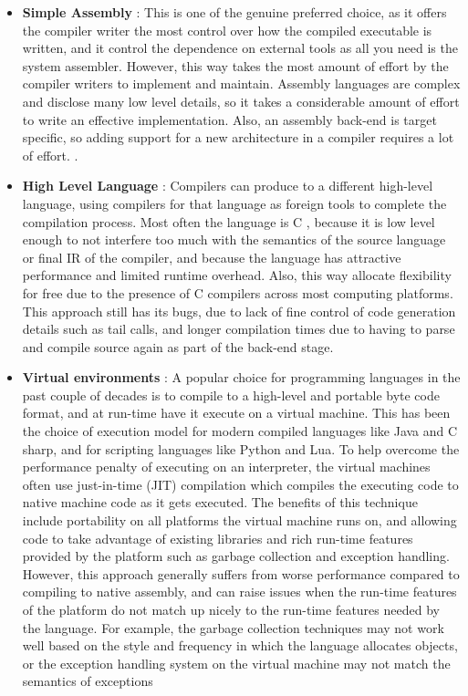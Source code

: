 \documentclass{book}
\begin{document}
	\begin{itemize}
		\item \textbf{Simple Assembly} :  This is one of the genuine preferred choice, as it offers the compiler
		writer the most control over how the compiled executable is written, and it control
		the dependence on external tools as all you need is the system assembler. However, this
		way takes the most amount of effort by the compiler writers to implement and
		maintain.  Assembly languages are complex and disclose many low level details, so
		it takes a considerable amount of effort to write an effective implementation.  Also,
		an assembly back-end is target specific, so adding support for a new architecture in a
		compiler requires a lot of effort.
		.
		\item \textbf{High Level Language} : Compilers can produce to a different high-level language, using
		compilers for that language as foreign tools to complete the compilation process.
		Most often the language is C ,  because it is low level enough to not interfere too much with the semantics of the source language or final IR of the compiler, and because the language has attractive performance and limited runtime overhead.  Also, this way allocate flexibility for free due to the presence of C compilers across most computing platforms. This approach still has its bugs, due to lack of fine control of	code generation details such as tail calls, and longer compilation times due to having	to parse and compile source again as part of the back-end stage. 
		\item \textbf{Virtual environments} : A popular choice for programming languages in the past couple of decades is to compile to a high-level and portable byte code format, and at run-time have it execute on a virtual machine. This has been the choice of execution model for modern compiled languages like Java and C sharp, and for  scripting  languages  like  Python  and  Lua.   To  help  overcome  the  performance penalty of executing on an interpreter,  the virtual machines often use just-in-time (JIT) compilation which compiles the executing code to native machine code as it gets executed. The benefits of this technique include portability on all platforms the virtual machine runs on, and allowing code to take advantage of existing libraries and rich run-time features provided by the platform such as garbage collection and exception handling.   However,  this approach generally suffers from worse performance compared to compiling to native assembly, and can raise issues when the run-time features of the platform do not match up nicely to the run-time features needed by the language.  For example, the garbage collection techniques may not work well based	on the style and frequency in which the language allocates objects, or the exception handling system on the virtual machine may not match the semantics of exceptions

\end{itemize}
\end{document}
